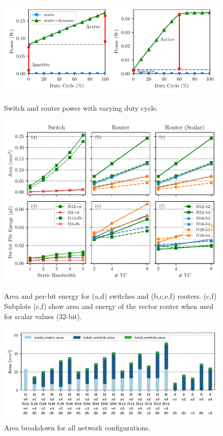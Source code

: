 \begin{figure}
\centering
\includegraphics[width=1\columnwidth]{figs/sweep.pdf}
  \caption{Switch and router power with varying duty cycle.}\label{fig:sweep}
\includegraphics[width=1\columnwidth]{figs/char.pdf}
  \caption{Area and per-bit energy for (a,d) switches and (b,c,e,f) routers. 
  (c,f) Subplots (c,f) show area and energy of the vector router when used for scalar values (32-bit).}\label{fig:char}
\includegraphics[width=1\columnwidth]{figs/area.pdf}
  \caption{Area breakdown for all network configurations.}\label{fig:area}
\end{figure}

